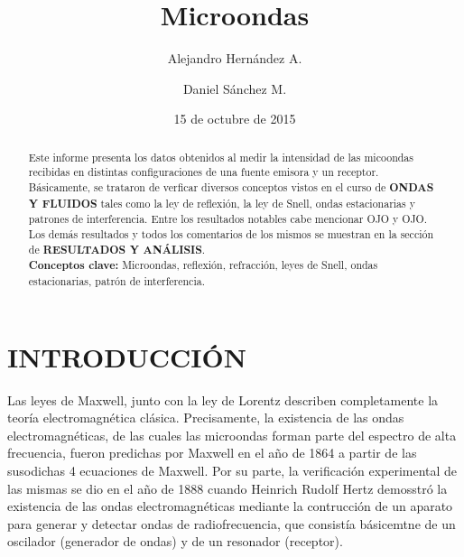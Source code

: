 \documentclass[prb,aps,twocolumn,preprintnumbers,amsmath,amssymb]{revtex4}
\begin{document}
\title{Microondas}%

\author{Alejandro Hernández A.}%
\author{Daniel Sánchez M.}%
%

\date{15 de octubre de 2015}%

\begin{abstract}
Este informe presenta los datos obtenidos al medir la intensidad de las micoondas recibidas en distintas configuraciones de una fuente emisora y un receptor. Básicamente, se trataron de verficar diversos conceptos vistos en el curso de \textbf{ONDAS Y FLUIDOS} tales como la ley de reflexión, la ley de Snell, ondas estacionarias y patrones de interferencia. Entre los resultados notables cabe mencionar OJO y OJO. Los demás resultados y todos los comentarios de los mismos se muestran en la sección de \textbf{RESULTADOS Y ANÁLISIS}.\\

\noindent \textbf{Conceptos clave:} Microondas, reflexión, refracción, leyes de Snell, ondas estacionarias, patrón de interferencia.
\end{abstract}
                             
\maketitle

\section{INTRODUCCIÓN}
Las leyes de Maxwell, junto con la ley de Lorentz describen completamente la teoría electromagnética clásica. Precisamente, la existencia de las ondas electromagnéticas, de las cuales las microondas forman parte del espectro de alta frecuencia, fueron predichas por Maxwell en el año de 1864 a partir de las susodichas 4 ecuaciones de Maxwell. Por su parte, la verificación experimental de las mismas se dio en el año de 1888 cuando Heinrich Rudolf Hertz demosstró la existencia de las ondas electromagnéticas mediante la contrucción de un aparato para generar y detectar ondas de radiofrecuencia, que consistía básicemtne de un oscilador (generador de ondas) y de un resonador (receptor).\\
\end{document}
